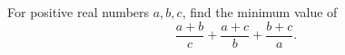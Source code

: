 For positive real numbers $a,b,c$, find the minimum value of
\[\dfrac{a+b}{c}+\dfrac{a+c}{b}+\dfrac{b+c}{a}.\]
